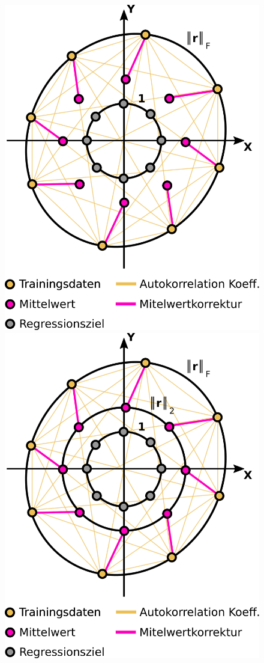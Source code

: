 \documentclass{beamer}
\begin{document}
\begin{frame}
\begin{columns}[c]
\begin{figure}
\begin{overprint}
			\includegraphics[width=\linewidth]{images/GPR_Mapping_Mean-2}
			\onslide<3>\includegraphics[width=\linewidth]{images/GPR_Mapping_Mean-3}

\end{overprint}
\end{figure}
\end{columns}
\end{frame}
\end{document}
